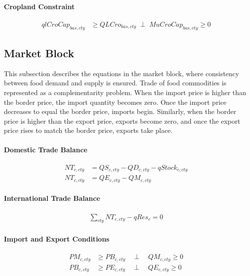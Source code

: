 \paragraph{Cropland Constraint}
\begin{align}
  qlCroCap_{bas,cty}
  &\ge
  QLCro_{bas,cty}
  \;\perp\;
  MuCroCap_{bas,cty} \ge 0
  \tag{CroCapEq}\label{eq:CroCapEq}
\end{align}


\subsection{Market Block}

This subsection describes the equations in the market block, where consistency between food demand and supply is ensured.  
Trade of food commodities is represented as a complementarity problem.  
When the import price is higher than the border price, the import quantity becomes zero.  
Once the import price decreases to equal the border price, imports begin.  
Similarly, when the border price is higher than the export price, exports become zero, and once the export price rises to match the border price, exports take place.

\paragraph{Domestic Trade Balance}
\begin{align}
  NT_{c,cty}
  &= QS_{c,cty} - QD_{c,cty} - qStock_{c,cty}
  \tag{ComBalEq}\label{eq:ComBalEq}\\[0.6em]
  NT_{c,cty}
  &= QE_{c,cty} - QM_{c,cty}
  \tag{NTEq}\label{eq:NTEq}
\end{align}

\paragraph{International Trade Balance}
\begin{align}
  \sum_{cty} NT_{c,cty} - qRes_{c} = 0
  \tag{WldBalEq}\label{eq:WldBalEq}
\end{align}

\paragraph{Import and Export Conditions}
\begin{align}
  PM_{c,cty} &\ge PB_{c,cty}
  \quad \perp \quad
  QM_{c,cty} \ge 0
  \tag{ImpParityEq}\label{eq:ImpParityEq}\\[0.4em]
  PB_{c,cty} &\ge PE_{c,cty}
  \quad \perp \quad
  QE_{c,cty} \ge 0
  \tag{ExpParityEq}\label{eq:ExpParityEq}
\end{align}



